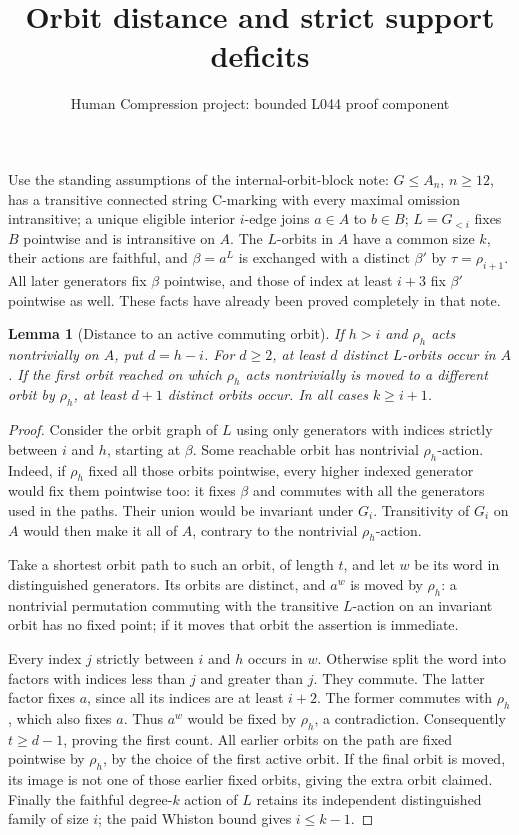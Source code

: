 \documentclass[11pt,a4paper]{article}
\title{Orbit distance and strict support deficits}
\author{Human Compression project: bounded L044 proof component}
\date{}
\newtheorem{lemma}{Lemma}
\begin{document}
\maketitle
Use the standing assumptions of the internal-orbit-block note:
$G\leq A_n$, $n\geq12$, has a transitive connected string
C-marking with every maximal omission intransitive; a unique
eligible interior $i$-edge joins $a\in A$ to $b\in B$;
$L=G_{<i}$ fixes $B$ pointwise and is intransitive on $A$.
The $L$-orbits in $A$ have a common size $k$, their actions
are faithful, and $\beta=a^L$ is exchanged with a distinct
$\beta'$ by $\tau=\rho_{i+1}$. All later generators fix
$\beta$ pointwise, and those of index at least $i+3$ fix
$\beta'$ pointwise as well. These facts have already been
proved completely in that note.

\begin{lemma}[Distance to an active commuting orbit]\label{distance}
If $h>i$ and $\rho_h$ acts nontrivially on $A$, put $d=h-i$.
For $d\geq2$, at least $d$ distinct $L$-orbits occur in $A$.
If the first orbit reached on which $\rho_h$ acts nontrivially
is moved to a different orbit by $\rho_h$, at least $d+1$
distinct orbits occur. In all cases $k\geq i+1$.
\end{lemma}
\begin{proof}
Consider the orbit graph of $L$ using only generators with
indices strictly between $i$ and $h$, starting at $\beta$.
Some reachable orbit has nontrivial $\rho_h$-action. Indeed,
if $\rho_h$ fixed all those orbits pointwise, every higher
indexed generator would fix them pointwise too: it fixes
$\beta$ and commutes with all the generators used in the
paths. Their union would be invariant under $G_i$.
Transitivity of $G_i$ on $A$ would then make it all of $A$,
contrary to the nontrivial $\rho_h$-action.

Take a shortest orbit path to such an orbit, of length $t$,
and let $w$ be its word in distinguished generators. Its
orbits are distinct, and $a^w$ is moved by $\rho_h$:
a nontrivial permutation commuting with the transitive
$L$-action on an invariant orbit has no fixed point; if it
moves that orbit the assertion is immediate.

Every index $j$ strictly between $i$ and $h$ occurs in $w$.
Otherwise split the word into factors with indices less
than $j$ and greater than $j$. They commute. The latter
factor fixes $a$, since all its indices are at least $i+2$.
The former commutes with $\rho_h$, which also fixes $a$.
Thus $a^w$ would be fixed by $\rho_h$, a contradiction.
Consequently $t\geq d-1$, proving the first count.
All earlier orbits on the path are fixed pointwise by
$\rho_h$, by the choice of the first active orbit.
If the final orbit is moved, its image is not one of those
earlier fixed orbits, giving the extra orbit claimed.
Finally the faithful degree-$k$ action of $L$ retains its
independent distinguished family of size $i$; the paid
Whiston bound gives $i\leq k-1$.
\end{proof}
\end{document}
